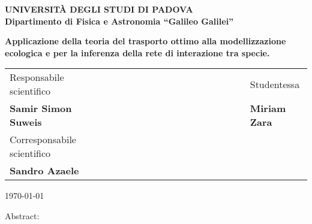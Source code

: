 \documentclass[a4paper,11pt,openright]{book}
\begin{document}
\frontmatter
\begin{titlepage}
\vspace{5mm}
\begin{center}
{{\huge{\textsc{\bf UNIVERSIT\`A DEGLI STUDI DI PADOVA}}}\\}
\vspace{5mm}
{\Large{\bf Dipartimento di Fisica e Astronomia ``Galileo Galilei''}} \\
\vspace{5mm}
\begin{spacing}{3}
{\LARGE \textbf{Applicazione della teoria del trasporto ottimo alla modellizzazione ecologica e per la inferenza della rete di interazione tra specie.}}\\
\end{spacing}
\vspace{8mm}
\end{center}

\vspace{10mm}
\begin{spacing}{2}
\begin{tabular}{ l  c  c c c cc c c c c c c c c c c  l }
{\Large{ Responsabile scientifico}} &&&&&&&&&&&&&&&&& {\Large{Studentessa}}\\
{\Large{\bf Samir Simon Suweis}} &&&&&&&&&&&&&&&&& {\Large{\bf Miriam Zara}}\\
{\Large{ Corresponsabile scientifico}} &&&&&&&&&&&&&&&&& \\
{\Large{\bf Sandro Azaele}} &&&&&&&&&&&&&&&&& \\

\end{tabular}
\end{spacing}
\vspace{10mm}

\begin{center}
{\Large \today }
\end{center}
\vspace*{5mm}
Abstract:


\end{titlepage}
\clearpage{\pagestyle{empty}\cleardoublepage}
\tableofcontents
\mainmatter





\printbibliography


\backmatter
\end{document}
